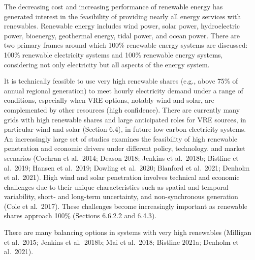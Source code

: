 \documentclass[
  letterpaper,
  DIV=11,
  numbers=noendperiod]{scrreprt}
\begin{document}
The decreasing cost and increasing performance of renewable energy has
generated interest in the feasibility of providing nearly all energy
services with renewables. Renewable energy includes wind power, solar
power, hydroelectric power, bioenergy, geothermal energy, tidal power,
and ocean power. There are two primary frames around which 100\%
renewable energy systems are discussed: 100\% renewable electricity
systems and 100\% renewable energy systems, considering not only
electricity but all aspects of the energy system.

It is technically feasible to use very high renewable shares (e.g.,
above 75\% of annual regional generation) to meet hourly electricity
demand under a range of conditions, especially when VRE options, notably
wind and solar, are complemented by other resources (high confidence).
There are currently many grids with high renewable shares and large
anticipated roles for VRE sources, in particular wind and solar (Section
6.4), in future low-carbon electricity systems. An increasingly large
set of studies examines the feasibility of high renewable penetration
and economic drivers under different policy, technology, and market
scenarios (Cochran et al.~2014; Deason 2018; Jenkins et al.~2018b;
Bistline et al.~2019; Hansen et al.~2019; Dowling et al.~2020; Blanford
et al.~2021; Denholm et al.~2021). High wind and solar penetration
involves technical and economic challenges due to their unique
characteristics such as spatial and temporal variability, short- and
long-term uncertainty, and non-synchronous generation (Cole et
al.~2017). These challenges become increasingly important as renewable
shares approach 100\% (Sections 6.6.2.2 and 6.4.3).

There are many balancing options in systems with very high renewables
(Milligan et al.~2015; Jenkins et al.~2018b; Mai et al.~2018; Bistline
2021a; Denholm et al.~2021).
\end{document}
